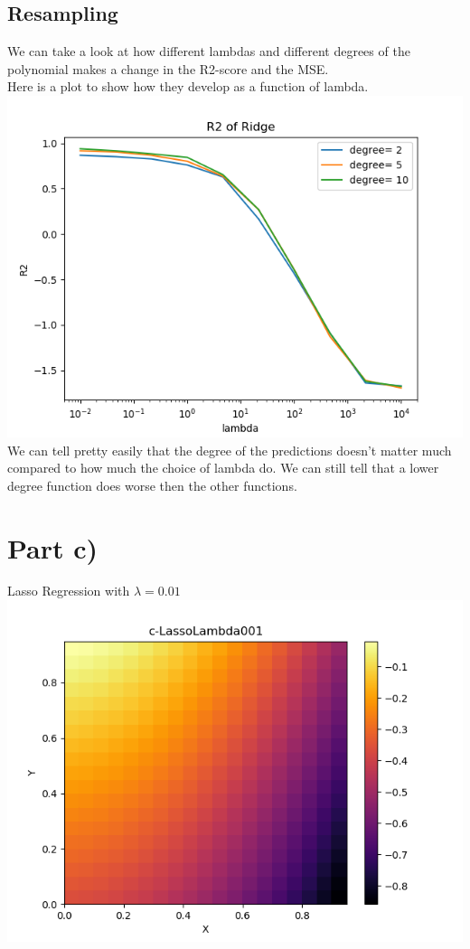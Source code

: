 \documentclass[a4paper,norsk]{article}
\begin{document}
\subsection*{Resampling}
We can take a look at how different lambdas and different degrees of the polynomial makes a change in the R2-score and the MSE.
\\Here is a plot to show how they develop as a function of lambda.
\\ \includegraphics[scale=.7]{R2Ridge}
\\ We can tell pretty easily that the degree of the predictions doesn't matter much compared to how much the choice of lambda do. We can still tell that a lower degree function does worse then the other functions.

\clearpage

\section*{Part c)}
Lasso Regression with $\lambda = 0.01$
\\ \includegraphics[scale=.7]{c-LassoLambda001}
\clearpage
\end{document}
